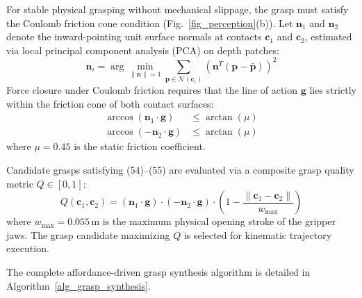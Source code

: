 \documentclass[journal]{IEEEtran}
\begin{document}
For stable physical grasping without mechanical slippage, the grasp must satisfy the Coulomb friction cone condition (Fig.~\ref{fig_perception}(b)). Let $\mathbf{n}_1$ and $\mathbf{n}_2$ denote the inward-pointing unit surface normals at contacts $\mathbf{c}_1$ and $\mathbf{c}_2$, estimated via local principal component analysis (PCA) on depth patches:
\begin{equation}
\mathbf{n}_i = \arg\min_{\|\mathbf{n}\|=1} \sum_{\mathbf{p} \in \mathcal{N}(\mathbf{c}_i)} \left( \mathbf{n}^T (\mathbf{p} - \bar{\mathbf{p}}) \right)^2
\end{equation}
Force closure under Coulomb friction requires that the line of action $\mathbf{g}$ lies strictly within the friction cone of both contact surfaces:
\begin{align}
\arccos\left( \mathbf{n}_1 \cdot \mathbf{g} \right) &\le \arctan(\mu) \\
\arccos\left( -\mathbf{n}_2 \cdot \mathbf{g} \right) &\le \arctan(\mu)
\end{align}
where $\mu = 0.45$ is the static friction coefficient.

Candidate grasps satisfying (54)–(55) are evaluated via a composite grasp quality metric $Q \in [0, 1]$:
\begin{equation}
Q(\mathbf{c}_1, \mathbf{c}_2) = \left( \mathbf{n}_1 \cdot \mathbf{g} \right) \cdot \left( -\mathbf{n}_2 \cdot \mathbf{g} \right) \cdot \left( 1 - \frac{\|\mathbf{c}_1 - \mathbf{c}_2\|}{w_{\text{max}}} \right)
\end{equation}
where $w_{\text{max}} = 0.055$\,m is the maximum physical opening stroke of the gripper jaws. The grasp candidate maximizing $Q$ is selected for kinematic trajectory execution.

The complete affordance-driven grasp synthesis algorithm is detailed in Algorithm~\ref{alg_grasp_synthesis}.
\end{document}
